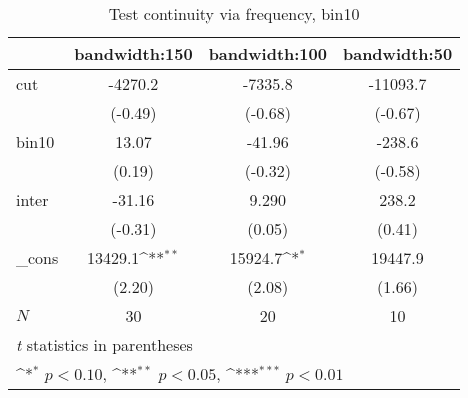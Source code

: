 \begin{table}[htbp]\centering
\def\sym#1{\ifmmode^{#1}\else\(^{#1}\)\fi}
\caption{Test continuity via frequency, bin10}
\begin{tabular}{l*{3}{c}}
\hline\hline
            &\multicolumn{1}{c}{bandwidth:150}&\multicolumn{1}{c}{bandwidth:100}&\multicolumn{1}{c}{bandwidth:50}\\
\hline
cut         &     -4270.2         &     -7335.8         &    -11093.7         \\
            &     (-0.49)         &     (-0.68)         &     (-0.67)         \\
[1em]
bin10       &       13.07         &      -41.96         &      -238.6         \\
            &      (0.19)         &     (-0.32)         &     (-0.58)         \\
[1em]
inter       &      -31.16         &       9.290         &       238.2         \\
            &     (-0.31)         &      (0.05)         &      (0.41)         \\
[1em]
\_cons      &     13429.1\sym{**} &     15924.7\sym{*}  &     19447.9         \\
            &      (2.20)         &      (2.08)         &      (1.66)         \\
\hline
\(N\)       &          30         &          20         &          10         \\
\hline\hline
\multicolumn{4}{l}{\footnotesize \textit{t} statistics in parentheses}\\
\multicolumn{4}{l}{\footnotesize \sym{*} \(p<0.10\), \sym{**} \(p<0.05\), \sym{***} \(p<0.01\)}\\
\end{tabular}
\end{table}
